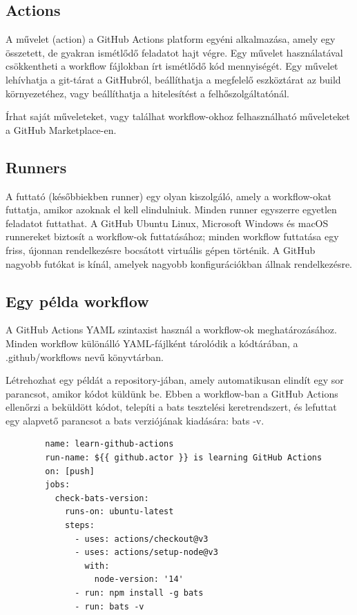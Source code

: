 \subsection{Actions}
A művelet (action) a GitHub Actions platform egyéni alkalmazása, amely egy összetett, de gyakran ismétlődő feladatot hajt végre. Egy művelet használatával csökkentheti a workflow fájlokban írt ismétlődő kód mennyiségét. Egy művelet lehívhatja a git-tárat a GitHubról, beállíthatja a megfelelő eszköztárat az build környezetéhez, vagy beállíthatja a hitelesítést a felhőszolgáltatónál.

Írhat saját műveleteket, vagy találhat workflow-okhoz felhasználható műveleteket a GitHub Marketplace-en.
\cite{github}

\subsection{Runners}
A futtató (későbbiekben runner) egy olyan kiszolgáló, amely a workflow-okat futtatja, amikor azoknak el kell elindulniuk. Minden runner egyszerre egyetlen feladatot futtathat. A GitHub Ubuntu Linux, Microsoft Windows és macOS runnereket biztosít a workflow-ok futtatásához; minden workflow futtatása egy friss, újonnan rendelkezésre bocsátott virtuális gépen történik. A GitHub nagyobb futókat is kínál, amelyek nagyobb konfigurációkban állnak rendelkezésre.
\cite{github}

\subsection{Egy példa workflow}
A GitHub Actions YAML szintaxist használ a workflow-ok meghatározásához. Minden workflow különálló YAML-fájlként tárolódik a kódtárában, a .github/workflows nevű könyvtárban.

Létrehozhat egy példát a repository-jában, amely automatikusan elindít egy sor parancsot, amikor kódot küldünk be. Ebben a workflow-ban a GitHub Actions ellenőrzi a beküldött kódot, telepíti a bats tesztelési keretrendszert, és lefuttat egy alapvető parancsot a bats verziójának kiadására: bats -v.
\cite{github}

\begin{center}
  \begin{minipage}{\linewidth}
    \begin{lstlisting}
        name: learn-github-actions
        run-name: ${{ github.actor }} is learning GitHub Actions
        on: [push]
        jobs:
          check-bats-version:
            runs-on: ubuntu-latest
            steps:
              - uses: actions/checkout@v3
              - uses: actions/setup-node@v3
                with:
                  node-version: '14'
              - run: npm install -g bats
              - run: bats -v
    \end{lstlisting}
    \end{minipage}
\end{center}

